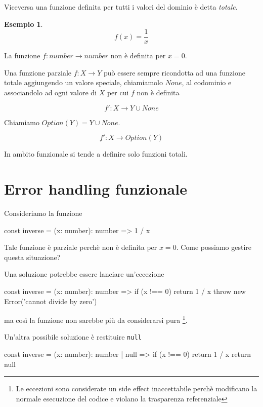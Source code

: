 \documentclass[12pt]{article}
\theoremstyle{definition}
\newtheorem{example}{Esempio}[section]
\newenvironment{code}
  {\vspace{0.5cm} \VerbatimEnvironment\begin{typescriptcode}}
  {\end{typescriptcode} \vspace{0.2cm}}
\begin{document}
Viceversa una funzione definita per tutti i valori del dominio è detta \emph{totale}.

\begin{example}
$$
f(x) = \frac{1}{x}
$$
\end{example}

La funzione $f: number \rightarrow number$ non è definita per $x = 0$.

Una funzione parziale $f: X \rightarrow Y$ può essere sempre ricondotta ad una funzione totale aggiungendo un valore speciale,
chiamiamolo $None$, al codominio e associandolo ad ogni valore di $X$ per cui $f$ non è definita

$$
f': X \rightarrow Y \cup None
$$

Chiamiamo $Option(Y) = Y \cup None$.

$$
f': X \rightarrow Option(Y)
$$

In ambito funzionale si tende a definire solo funzioni totali.

\newpage

\section{Error handling funzionale}

Consideriamo la funzione

\begin{code}
const inverse = (x: number): number => 1 / x
\end{code}

Tale funzione è parziale perchè non è definita per $x = 0$. Come possiamo gestire questa situazione?

Una soluzione potrebbe essere lanciare un'eccezione

\begin{code}
const inverse = (x: number): number => {
  if (x !== 0) return 1 / x
  throw new Error('cannot divide by zero')
}
\end{code}

ma così la funzione non sarebbe più da considerarsi pura
\footnote{Le eccezioni sono considerate un side effect inaccettabile perchè modificano la normale esecuzione del codice
e violano la trasparenza referenziale}.

Un'altra possibile soluzione è restituire \texttt{null}

\begin{code}
const inverse = (x: number): number | null => {
  if (x !== 0) return 1 / x
  return null
}
\end{code}
\end{document}
